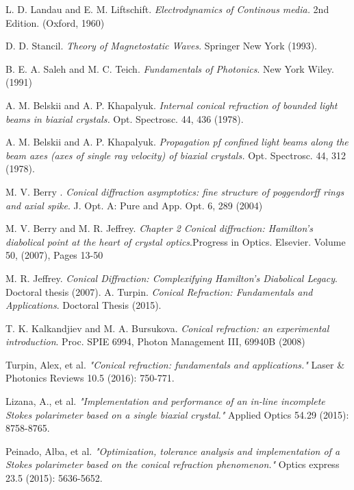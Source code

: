 \documentclass[11pt, a4paper, twoside]{article} %
\begin{document}
\begin{thebibliography}{1}
{\small 
{}
L. D. Landau and E. M. Liftschift. {\em Electrodynamics of Continous media.} 2nd Edition. (Oxford, 1960)

D. D. Stancil. {\em Theory of Magnetostatic Waves}. Springer New York (1993).

B. E. A. Saleh and M. C. Teich. {\em Fundamentals of Photonics}. New York Wiley. (1991)

A. M. Belskii and A. P. Khapalyuk. {\em Internal conical refraction of bounded light beams in biaxial crystals.} Opt. Spectrosc. 44, 436 (1978).

A. M. Belskii and A. P. Khapalyuk. {\em Propagation pf confined light beams along the beam axes (axes of single ray velocity) of biaxial crystals.} Opt. Spectrosc. 44, 312 (1978).

M. V. Berry . {\em Conical diffraction asymptotics: fine structure of poggendorff rings and axial spike}. J. Opt. A: Pure and App. Opt. 6, 289 (2004)

M. V. Berry and M. R. Jeffrey. {\em Chapter 2 Conical diffraction: Hamilton's diabolical point at the heart of crystal optics}.Progress in Optics. Elsevier. Volume 50, (2007), Pages 13-50

M. R. Jeffrey. {\em Conical Diffraction: Complexifying
Hamilton’s Diabolical Legacy}. Doctoral thesis (2007).
A. Turpin. {\em Conical Refraction: Fundamentals and Applications}. Doctoral Thesis (2015).

T. K. Kalkandjiev and M. A. Bursukova. {\em Conical refraction: an experimental introduction}. Proc. SPIE 6994, Photon Management III, 69940B (2008)

Turpin, Alex, et al. {\em "Conical refraction: fundamentals and applications."} Laser \& Photonics Reviews 10.5 (2016): 750-771.

Lizana, A., et al. {\em "Implementation and performance of an in-line incomplete Stokes polarimeter based on a single biaxial crystal."} Applied Optics 54.29 (2015): 8758-8765.

Peinado, Alba, et al. {\em "Optimization, tolerance analysis and implementation of a Stokes polarimeter based on the conical refraction phenomenon."} Optics express 23.5 (2015): 5636-5652.

}
\end{thebibliography}
\end{document}
